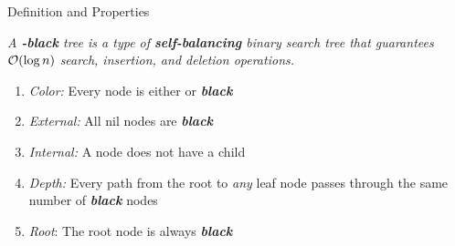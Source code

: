 \documentclass[aspectratio=169]{beamer}
\newcommand{\textib}[1]{\textit{\textbf{{#1}}}}
\newcommand{\red}{\textib{\color{red}{red }}}
\newcommand{\define}[1]{\begin{tcolorbox}[title={Definition}]\small{\textit{{#1}}}\end{tcolorbox}}
\begin{document}
\begin{frame}[fragile]{Definition and Properties}
    \define {
        A \textib{\color{red}{red}}\textib{-black} tree is a type of \textib{self-balancing} binary 
        search tree that guarantees ${\cal{O}}(\log n)$ search, insertion, and deletion operations.
    }
    \begin{minipage}{.45\textwidth}
        \begin{enumerate}[label=\textit{(\roman*)}]
            \item<0> \textit{Color:} Every node is either \red or \textib{black}
            \item<0> \textit{External:} All nil nodes are \textib{black}
            \item<0> \textit{Internal:} A \red node does not have a \red child
            \item<0> \textit{Depth:} Every path from the root to \textit{any} leaf node passes through
                the same number of \textib{black} nodes
            \item \textit{Root}: The root node is always \textib{black}
        \end{enumerate}
    \end{minipage}
    \hfill
    \begin{minipage}{.5\textwidth}
        \centering
    \end{minipage}
\end{frame}
\end{document}
